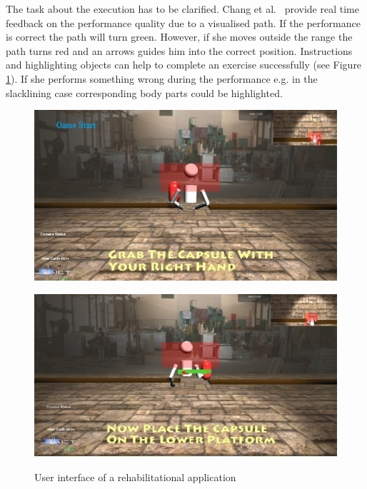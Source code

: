 The task about the execution has to be clarified. Chang et al.~\cite{Chang2012-hz} provide real time feedback on the performance quality due to a visualised path. If the performance is correct the path will turn green. However, if she moves outside the range the path turns red and an arrows guides him into the correct position. Instructions and highlighting objects can help to complete an exercise successfully (see Figure \ref{fig:gameUIChang}). If she performs something wrong during the performance e.g. in the slacklining case corresponding body parts could be highlighted.
\begin{figure}[htb]
	\centering
	\begin{minipage}[t]{0.49\linewidth}
		\centering
		\includegraphics[width=1\linewidth]{Pictures/gameInstruction}
		\label{fig:gameInstruction}
	\end{minipage}
	\hfill
	\begin{minipage}[t]{0.49\linewidth}
		\centering
		\includegraphics[width=1\linewidth]{Pictures/gameHighlighting}
		\label{fig:gameHighlighting}
	\end{minipage}
	\caption{User interface of a rehabilitational application~\cite{Chang2012-hz}}
	\label{fig:gameUIChang}
\end{figure}

